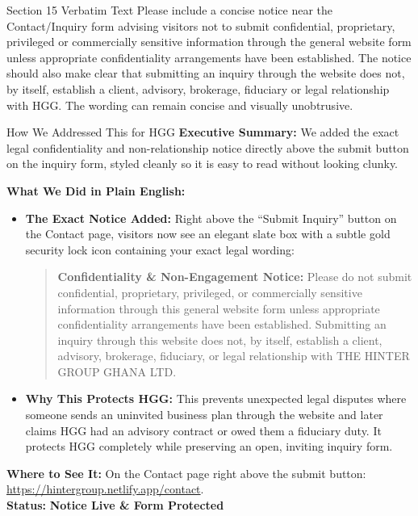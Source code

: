 \documentclass[11pt,a4paper]{article}
\begin{document}
\begin{VerbatimClientBox}{Section 15 Verbatim Text}
Please include a concise notice near the Contact/Inquiry form advising visitors not to submit confidential, proprietary, privileged or commercially sensitive information through the general website form unless appropriate confidentiality arrangements have been established.
The notice should also make clear that submitting an inquiry through the website does not, by itself, establish a client, advisory, brokerage, fiduciary or legal relationship with HGG.
The wording can remain concise and visually unobtrusive.
\end{VerbatimClientBox}

\begin{DetailedResolutionBox}{How We Addressed This for HGG}
\textbf{Executive Summary:} We added the exact legal confidentiality and non-relationship notice directly above the submit button on the inquiry form, styled cleanly so it is easy to read without looking clunky.

\textbf{What We Did in Plain English:}
\begin{itemize}
    \item \textbf{The Exact Notice Added:} Right above the ``Submit Inquiry'' button on the Contact page, visitors now see an elegant slate box with a subtle gold security lock icon containing your exact legal wording:
    \begin{quote}
    \small
    \textbf{Confidentiality \& Non-Engagement Notice:} Please do not submit confidential, proprietary, privileged, or commercially sensitive information through this general website form unless appropriate confidentiality arrangements have been established. Submitting an inquiry through this website does not, by itself, establish a client, advisory, brokerage, fiduciary, or legal relationship with THE HINTER GROUP GHANA LTD.
    \end{quote}
    \item \textbf{Why This Protects HGG:} This prevents unexpected legal disputes where someone sends an uninvited business plan through the website and later claims HGG had an advisory contract or owed them a fiduciary duty. It protects HGG completely while preserving an open, inviting inquiry form.
\end{itemize}

\textbf{Where to See It:} On the Contact page right above the submit button: \url{https://hintergroup.netlify.app/contact}. \\
\textbf{Status:} \textcolor{HGGGreen}{\textbf{Notice Live \& Form Protected}}
\end{DetailedResolutionBox}
\end{document}
